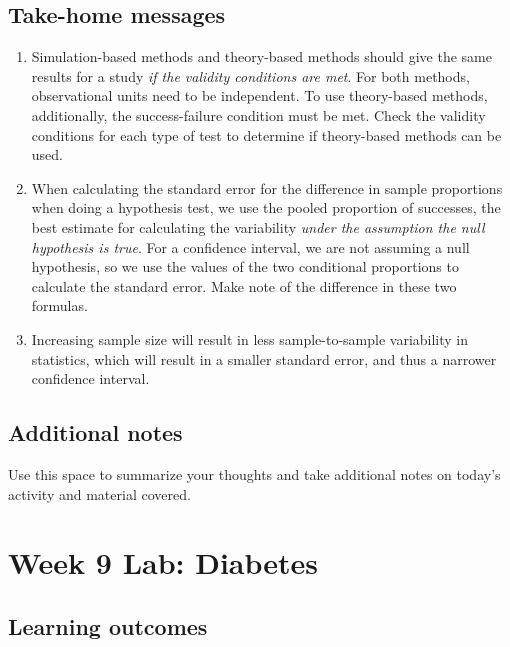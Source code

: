 \documentclass[
]{report}
\begin{document}
\newpage

\hypertarget{take-home-messages-16}{%
\subsection{Take-home messages}\label{take-home-messages-16}}

\begin{enumerate}
\def\labelenumi{\arabic{enumi}.}
\item
  Simulation-based methods and theory-based methods should give the same results for a study \emph{if the validity conditions are met}. For both methods, observational units need to be independent. To use theory-based methods, additionally, the success-failure condition must be met. Check the validity conditions for each type of test to determine if theory-based methods can be used.
\item
  When calculating the standard error for the difference in sample proportions when doing a hypothesis test, we use the pooled proportion of successes, the best estimate for calculating the variability \emph{under the assumption the null hypothesis is true}. For a confidence interval, we are not assuming a null hypothesis, so we use the values of the two conditional proportions to calculate the standard error. Make note of the difference in these two formulas.
\item
  Increasing sample size will result in less sample-to-sample variability in statistics, which will result in a smaller standard error, and thus a narrower confidence interval.
\end{enumerate}

\hypertarget{additional-notes-15}{%
\subsection{Additional notes}\label{additional-notes-15}}

Use this space to summarize your thoughts and take additional notes on today's activity and material covered.

\newpage

\hypertarget{week-9-lab-diabetes}{%
\section{Week 9 Lab: Diabetes}\label{week-9-lab-diabetes}}


\hypertarget{learning-outcomes-19}{%
\subsection{Learning outcomes}\label{learning-outcomes-19}}
\end{document}
